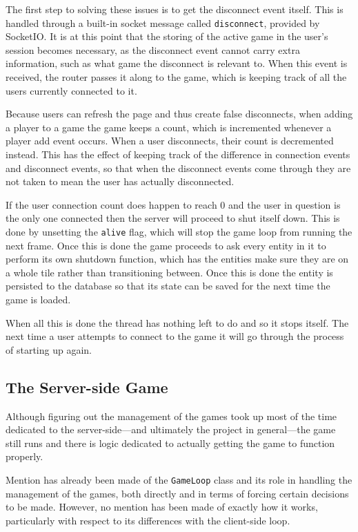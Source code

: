The first step to solving these issues is to get the disconnect event itself. This is handled through a built-in socket message called \texttt{disconnect}, provided by SocketIO. It is at this point that the storing of the active game in the user's session becomes necessary, as the disconnect event cannot carry extra information, such as what game the disconnect is relevant to. When this event is received, the router passes it along to the game, which is keeping track of all the users currently connected to it.

Because users can refresh the page and thus create false disconnects, when adding a player to a game the game keeps a count, which is incremented whenever a player add event occurs. When a user disconnects, their count is decremented instead. This has the effect of keeping track of the difference in connection events and disconnect events, so that when the disconnect events come through they are not taken to mean the user has actually disconnected.

If the user connection count does happen to reach 0 and the user in question is the only one connected then the server will proceed to shut itself down. This is done by unsetting the \texttt{alive} flag, which will stop the game loop from running the next frame. Once this is done the game proceeds to ask every entity in it to perform its own shutdown function, which has the entities make sure they are on a whole tile rather than transitioning between. Once this is done the entity is persisted to the database so that its state can be saved for the next time the game is loaded.

When all this is done the thread has nothing left to do and so it stops itself. The next time a user attempts to connect to the game it will go through the process of starting up again.

\subsection{The Server-side Game}\label{server_movement}
Although figuring out the management of the games took up most of the time dedicated to the server-side---and ultimately the project in general---the game still runs and there is logic dedicated to actually getting the game to function properly.

Mention has already been made of the \texttt{GameLoop} class and its role in handling the management of the games, both directly and in terms of forcing certain decisions to be made. However, no mention has been made of exactly how it works, particularly with respect to its differences with the client-side loop.

